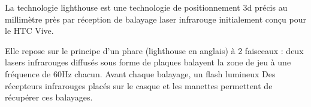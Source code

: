 ﻿La technologie lighthouse est une technologie de positionnement 3d précis au millimètre près par réception de balayage laser infrarouge initialement conçu pour le HTC Vive.

Elle repose sur le principe d'un phare (lighthouse en anglais) à 2 faisceaux : deux lasers infrarouges diffusés sous forme de plaques balayent la zone de jeu à une fréquence de 60Hz chacun. Avant chaque balayage, un flash lumineux Des récepteurs infrarouges placés sur le casque et les manettes permettent de récupérer ces balayages. 